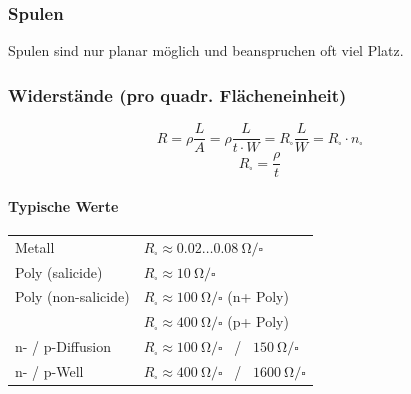 \subsubsection{Spulen}
Spulen sind nur planar möglich und beanspruchen oft viel Platz.


\subsubsection{Widerstände (pro quadr. Flächeneinheit)}

\begin{minipage}[c]{0.44\columnwidth}
    \[ \boxed{ R = \rho \frac{L}{A} = \rho \frac{L}{t \cdot W} = R_\square \frac{L}{W} = R_\square \cdot n_\square } \]
    \[ \boxed{ R_\square = \frac{\rho}{t} } \]
\end{minipage}
\hfill
\begin{minipage}[c]{0.54\columnwidth}
    \paragraph{Typische Werte}
    \resizebox{\columnwidth}{!}
    {
    \begin{tabular}{@{}l l@{}}
            Metall              & $R_\square \approx 0.02 \dots \qty{0.08}{\ohm}/\square$                           \\
            Poly (salicide)     & $R_\square \approx \qty{10}{\ohm}/\square$                                        \\
            Poly (non-salicide) & $R_\square \approx \qty{100}{\ohm}/\square$ (n+ Poly)                             \\
                                & $R_\square \approx \qty{400}{\ohm}/\square$ (p+ Poly)                             \\
            n- / p-Diffusion    & $R_\square \approx \qty{100}{\ohm}/\square$ \, / \,  $\qty{150}{\ohm}/\square$    \\
            n- / p-Well         & $R_\square \approx \qty{400}{\ohm}/\square$ \, / \,  $\qty{1600}{\ohm}/\square$   \\
        \end{tabular}
    }
\end{minipage}




